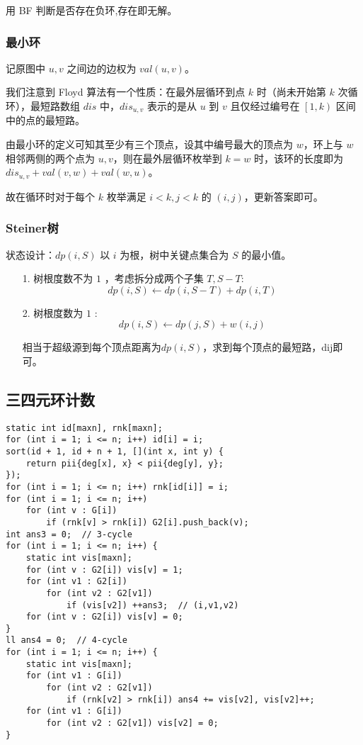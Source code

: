 \documentclass[twoside]{article}
\begin{document}
用 BF 判断是否存在负环,存在即无解。\subsubsection{最小环}
记原图中 $u,v$ 之间边的边权为 $val\left(u,v\right)$。

我们注意到 Floyd 算法有一个性质：在最外层循环到点 $k$ 时（尚未开始第 $k$ 次循环），最短路数组 $dis$ 中，$dis_{u,v}$ 表示的是从 $u$ 到 $v$ 且仅经过编号在 $\left[1, k\right)$ 区间中的点的最短路。

由最小环的定义可知其至少有三个顶点，设其中编号最大的顶点为 $w$，环上与 $w$ 相邻两侧的两个点为 $u,v$，则在最外层循环枚举到 $k=w$ 时，该环的长度即为 $dis_{u,v}+val\left(v,w\right)+val\left(w,u\right)$。

故在循环时对于每个 $k$ 枚举满足 $i<k,j<k$ 的 $(i,j)$，更新答案即可。\subsubsection{Steiner树}
状态设计：$dp(i,S)$ 以 $i$ 为根，树中关键点集合为 $S$ 的最小值。

\begin{enumerate}
    \item[1.] 树根度数不为 $1$ ，考虑拆分成两个子集 $T,S-T$:
    $$ dp(i,S) \gets dp(i,S-T)+dp(i,T) $$
    \item[2.] 树根度数为 $1$ :
    $$ dp(i,S) \gets dp(j,S)+w(i,j) $$

    相当于超级源到每个顶点距离为$dp(i,S)$，求到每个顶点的最短路，dij即可。
\end{enumerate}
\subsection{三四元环计数}
\begin{lstlisting}
static int id[maxn], rnk[maxn];
for (int i = 1; i <= n; i++) id[i] = i;
sort(id + 1, id + n + 1, [](int x, int y) {
	return pii{deg[x], x} < pii{deg[y], y};
});
for (int i = 1; i <= n; i++) rnk[id[i]] = i;
for (int i = 1; i <= n; i++)
	for (int v : G[i])
		if (rnk[v] > rnk[i]) G2[i].push_back(v);
int ans3 = 0;  // 3-cycle
for (int i = 1; i <= n; i++) {
	static int vis[maxn];
	for (int v : G2[i]) vis[v] = 1;
	for (int v1 : G2[i])
		for (int v2 : G2[v1])
			if (vis[v2]) ++ans3;  // (i,v1,v2)
	for (int v : G2[i]) vis[v] = 0;
}
ll ans4 = 0;  // 4-cycle
for (int i = 1; i <= n; i++) {
	static int vis[maxn];
	for (int v1 : G[i])
		for (int v2 : G2[v1])
			if (rnk[v2] > rnk[i]) ans4 += vis[v2], vis[v2]++;
	for (int v1 : G[i])
		for (int v2 : G2[v1]) vis[v2] = 0;
}\end{lstlisting}
\end{document}
